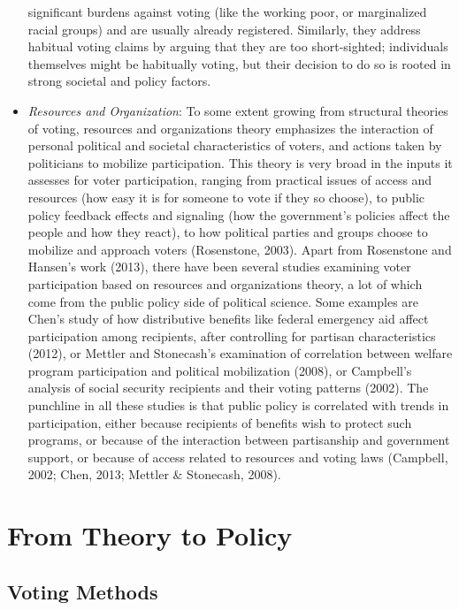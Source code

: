 \documentclass[12pt,twoside]{reedthesis}
\begin{document}
\begin{itemize}
    significant burdens against voting (like the working poor, or
    marginalized racial groups) and are usually already registered.
    Similarly, they address habitual voting claims by arguing that they
    are too short-sighted; individuals themselves might be habitually
    voting, but their decision to do so is rooted in strong societal and
    policy factors.
  \item
    \emph{Resources and Organization}: To some extent growing from
    structural theories of voting, resources and organizations theory
    emphasizes the interaction of personal political and societal
    characteristics of voters, and actions taken by politicians to
    mobilize participation. This theory is very broad in the inputs it
    assesses for voter participation, ranging from practical issues of
    access and resources (how easy it is for someone to vote if they so
    choose), to public policy feedback effects and signaling (how the
    government's policies affect the people and how they react), to how
    political parties and groups choose to mobilize and approach voters
    (Rosenstone, 2003). Apart from Rosenstone and Hansen's work (2013),
    there have been several studies examining voter participation based on
    resources and organizations theory, a lot of which come from the
    public policy side of political science. Some examples are Chen's
    study of how distributive benefits like federal emergency aid affect
    participation among recipients, after controlling for partisan
    characteristics (2012), or Mettler and Stonecash's examination of
    correlation between welfare program participation and political
    mobilization (2008), or Campbell's analysis of social security
    recipients and their voting patterns (2002). The punchline in all
    these studies is that public policy is correlated with trends in
    participation, either because recipients of benefits wish to protect
    such programs, or because of the interaction between partisanship and
    government support, or because of access related to resources and
    voting laws (Campbell, 2002; Chen, 2013; Mettler \& Stonecash, 2008).
  \end{itemize}
  
  \section{From Theory to Policy}\label{from-theory-to-policy}
  
  \subsection{Voting Methods}\label{voting-methods}
  
\end{document}
